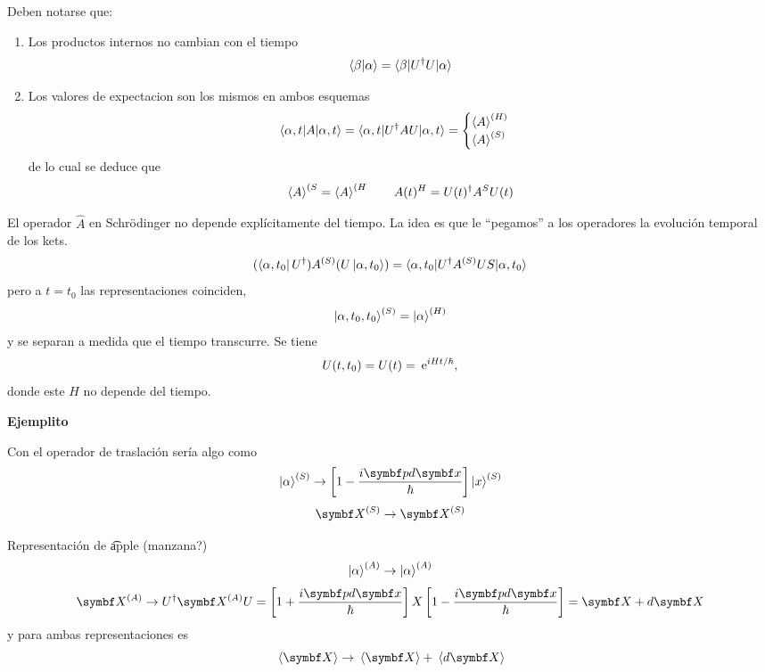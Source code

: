 \documentclass[10pt,oneside]{CBFT_book}
\begin{document}
Deben notarse que:
\begin{enumerate}
 \item Los productos internos no cambian con el tiempo
 \[
	\braket{\beta|\alpha} = \braket{\beta|U^\dagger U|\alpha} 
 \]
 \item Los valores de expectacion son los mismos en ambos esquemas
 \[
	\braket{\alpha,t|A|\alpha,t} = \braket{\alpha,t|U^\dagger AU|\alpha,t} =
	\begin{cases}
	 \braket{A}^{(H)} \\
	 \braket{A}^{(S)}
	\end{cases}
 \]
 de lo cual se deduce que 
 \[
	\Braket{A}^{(S} = \Braket{A}^{(H} \qquad A(t)^H = U(t)^\dagger A^S U(t)
 \]
\end{enumerate}

El operador $\hat{A}$ en Schrödinger no depende explícitamente del tiempo. La idea es que le ``pegamos'' a los 
operadores la evolución temporal de los kets.
\[
	(\Bra{ \alpha, t_0 } U^\dagger) A^{(S)} (U \Ket{\alpha, t_0 }) = 
	\braket{ \alpha, t_0 | U^\dagger A^{(S)} US | \alpha, t_0 }
\]
pero a $t=t_0$ las representaciones coinciden,
\[
	\Ket{\alpha,t_0,t_0}^{(S)} = \Ket{\alpha}^{(H)}
\]
y se separan a medida que el tiempo transcurre.
Se tiene
\[
	U(t,t_0)  = U(t) = \:\mathrm{e}^{i H t / \hbar},
\]
donde este $H$ no depende del tiempo.

\begin{ejemplo}{\bf Ejemplito}

Con el operador de traslación sería algo como
\[
	\Ket{\a}^{(S)} \to \left[ 1 - \frac{i\vb p d\vb x}{\hbar}\right] \Ket{x}^{(S)}
\]
\[
	\vb X^{(S)} \to \vb X^{(S)}
\]

Representación de {\t apple} (manzana?)
\[
	\Ket{\alpha}^{(A)} \to \Ket{\alpha}^{(A)}
\]
\[
	\vb X^{(A)} \to U^\dagger \vb X^{(A)} U =
	\left[ 1 + \frac{i\vb p d\vb x}{\hbar}\right] X \left[ 1 - \frac{i\vb p d\vb x}{\hbar}\right]
	= \vb X + d\vb X
\]
y para ambas representaciones es 
\[
	\vm{\vb X} \to \vm{\vb X} + \vm{d\vb X}
\]
 
\end{ejemplo}
\end{document}
